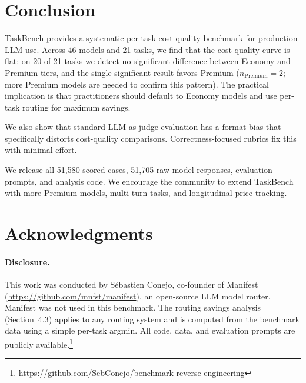 \documentclass[11pt]{article}
\begin{document}
\section{Conclusion}

TaskBench provides a systematic per-task cost-quality benchmark for
production LLM use.  Across 46 models and 21 tasks, we find that the
cost-quality curve is flat: on 20 of 21 tasks we detect no significant
difference between Economy and Premium tiers, and the single significant
result favors Premium ($n_{\text{Premium}} = 2$; more Premium
models are needed to confirm this pattern).  The practical
implication is that practitioners should default to Economy models and
use per-task routing for maximum savings.

We also show that standard LLM-as-judge evaluation has a format bias that
specifically distorts cost-quality comparisons.  Correctness-focused
rubrics fix this with minimal effort.

We release all 51{,}580 scored cases, 51{,}705 raw model responses,
evaluation prompts, and analysis code.  We encourage the community to
extend TaskBench with more Premium models, multi-turn tasks, and
longitudinal price tracking.


\section*{Acknowledgments}

\paragraph{Disclosure.}  This work was conducted by S\'{e}bastien Conejo,
co-founder of Manifest (\url{https://github.com/mnfst/manifest}), an
open-source LLM model router.  Manifest was not used in this benchmark.
The routing savings analysis (Section~4.3) applies to any routing system
and is computed from the benchmark data using a simple per-task argmin.
All code, data, and evaluation prompts are publicly available.\footnote{\url{https://github.com/SebConejo/benchmark-reverse-engineering}}



\end{document}

